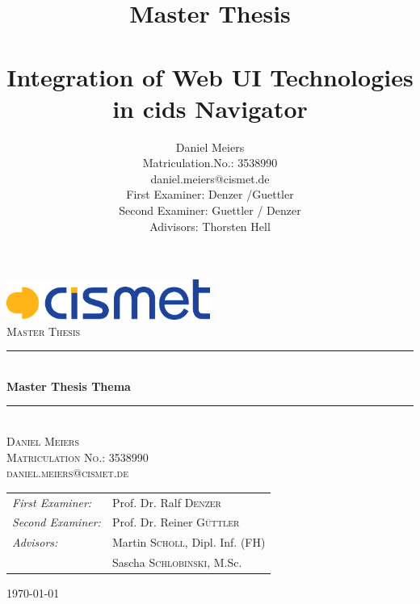 

\title{%
\large Master Thesis\\
\\[20mm]
{\LARGE Integration of Web UI Technologies in cids Navigator}\\[30mm]
}


\author{%
Daniel Meiers\\
Matriculation.No.: 3538990\\
daniel.meiers@cismet.de\\[15mm]
First Examiner: Denzer /Guettler\\
Second Examiner: Guettler / Denzer\\
Adivisors: Thorsten Hell\\[20mm]
}

\newcommand{\HRule}{\rule{\linewidth}{0.5mm}}




\begin{titlepage}
\begin{center}

\includegraphics[width=0.5\textwidth]{img/logo}~\\[1cm]

\textsc{\LARGE Master Thesis}\\[1.5cm]

\HRule \\[0.4cm]
{ \huge \bfseries Master Thesis Thema \\[0.4cm] }

\HRule \\[1.5cm]

\textsc{\Large Daniel Meiers}\\[0.2cm]
\textsc{\Large Matriculation No.: 3538990}\\[0.2cm]
\textsc{\Large daniel.meiers@cismet.de}\\[4cm]

\begin{tabular}[0.8\textwidth]{l l}
\emph{First Examiner:} & Prof. Dr. Ralf \textsc{Denzer} \\
\emph{Second Examiner:} & Prof. Dr. Reiner \textsc{Güttler} \\
\emph{Advisors:} & Martin \textsc{Scholl}, Dipl. Inf. (FH) \\
 				& Sascha \textsc{Schlobinski}, M.Sc.
\end{tabular}


\vfill

{\large \today}

\end{center}
\end{titlepage}  
 
